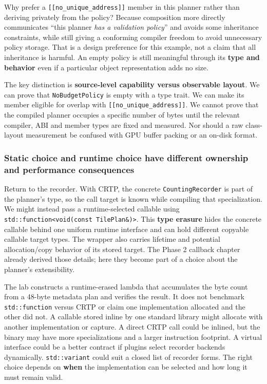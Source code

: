 Why prefer a \texttt{{[}{[}no\_unique\_address{]}{]}} member in this planner rather than deriving privately from the policy? Because composition more directly communicates ``this planner \emph{has a validation policy}'' and avoids some inheritance constraints, while still giving a conforming compiler freedom to avoid unnecessary policy storage. That is a design preference for this example, not a claim that all inheritance is harmful. An empty policy is still meaningful through its \textbf{type and behavior} even if a particular object representation adds no size.

The key distinction is \textbf{source-level capability versus observable layout}. We can prove that \texttt{NoBudgetPolicy} is empty with a type trait. We can make its member eligible for overlap with \texttt{{[}{[}no\_unique\_address{]}{]}}. We cannot prove that the compiled planner occupies a specific number of bytes until the relevant compiler, ABI and member types are fixed and measured. Nor should a raw class-layout measurement be confused with GPU buffer packing or an on-disk format.

\subsubsection{Static choice and runtime choice have different ownership and performance consequences}\label{static-choice-and-runtime-choice-have-different-ownership-and-performance-consequences}

Return to the recorder. With CRTP, the concrete \texttt{CountingRecorder} is part of the planner's type, so the call target is known while compiling that specialization. We might instead pass a runtime-selected callable using \texttt{std::function\textless{}void(const\ TilePlan\&)\textgreater{}}. This \textbf{type erasure} hides the concrete callable behind one uniform runtime interface and can hold different copyable callable target types. The wrapper also carries lifetime and potential allocation/copy behavior of its stored target. The Phase 2 callback chapter already derived those details; here they become part of a choice about the planner's extensibility.

The lab constructs a runtime-erased lambda that accumulates the byte count from a 48-byte metadata plan and verifies the result. It does not benchmark \texttt{std::function} versus CRTP or claim one implementation allocated and the other did not. A callable stored inline by one standard library might allocate with another implementation or capture. A direct CRTP call could be inlined, but the binary may have more specializations and a larger instruction footprint. A virtual interface could be a better contract if plugins select recorder backends dynamically. \texttt{std::variant} could suit a closed list of recorder forms. The right choice depends on \textbf{when} the implementation can be selected and how long it must remain valid.

